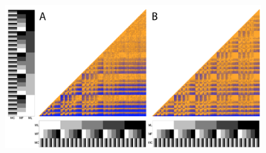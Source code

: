 \documentclass[12pt,letterpaper]{article}
\begin{document}
\newpage
\begin{figure}
\centering
    \includegraphics[width=1\textwidth]{Figures/In_main/PairwiseComp-Baycon-RF+Tr-colour.png} %
\caption{ }
\end{figure} %
\end{document}
